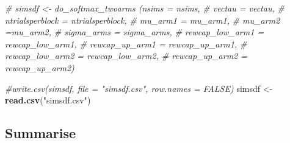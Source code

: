 \documentclass[
]{article}
\newenvironment{Shaded}{\begin{snugshade}}{\end{snugshade}}
\newcommand{\CommentTok}[1]{\textcolor[rgb]{0.56,0.35,0.01}{\textit{#1}}}
\newcommand{\FunctionTok}[1]{\textcolor[rgb]{0.13,0.29,0.53}{\textbf{#1}}}
\newcommand{\NormalTok}[1]{#1}
\newcommand{\OtherTok}[1]{\textcolor[rgb]{0.56,0.35,0.01}{#1}}
\newcommand{\StringTok}[1]{\textcolor[rgb]{0.31,0.60,0.02}{#1}}
\begin{document}
\begin{Shaded}
\begin{Highlighting}[]
\CommentTok{\# simsdf \textless{}{-} do\_softmax\_twoarms (nsims = nsims,}
\CommentTok{\#                                     vectau = vectau,}
\CommentTok{\#                                     ntrialsperblock = ntrialsperblock,}
\CommentTok{\#                                     mu\_arm1 = mu\_arm1,}
\CommentTok{\#                                     mu\_arm2 =mu\_arm2,}
\CommentTok{\#                                     sigma\_arms = sigma\_arms,}
\CommentTok{\#                                     rewcap\_low\_arm1 = rewcap\_low\_arm1,}
\CommentTok{\#                                     rewcap\_up\_arm1 = rewcap\_up\_arm1,}
\CommentTok{\#                                     rewcap\_low\_arm2 = rewcap\_low\_arm2,}
\CommentTok{\#                                     rewcap\_up\_arm2 = rewcap\_up\_arm2)}

\CommentTok{\#write.csv(simsdf, file = "simsdf.csv", row.names = FALSE)}
\NormalTok{simsdf }\OtherTok{\textless{}{-}} \FunctionTok{read.csv}\NormalTok{(}\StringTok{"simsdf.csv"}\NormalTok{)}
\end{Highlighting}
\end{Shaded}

\subsection{Summarise}\label{summarise}
\end{document}
